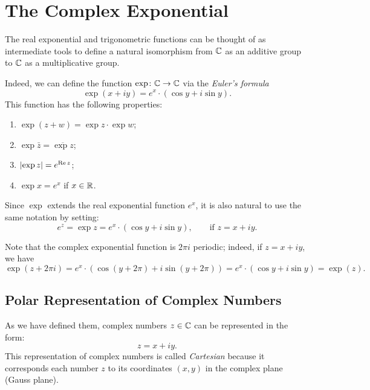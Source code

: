 \section{The Complex Exponential}
\label{sec:esponenziale_complesso}%

The real exponential and trigonometric functions can be thought of as
intermediate tools to define a natural isomorphism from ${\mathbb C}$ as an additive
group to ${\mathbb C}$ as a multiplicative group.

Indeed, we can define the function $\exp \colon {\mathbb C} \to {\mathbb C}$ via the
\emph{Euler's formula}
\[
 \exp(x+iy) = e^x \cdot (\cos y + i \sin y).
\]
This function has the following properties:
\begin{enumerate}
  \item $\exp(z+w) = \exp z \cdot \exp w$;
  \item $\exp\bar z = \overline{\exp z}$;
  \item ${\left|\exp z\right|} = e^{\operatorname{Re} z}$;
  \item $\exp x = e^x$ if $x\in {\mathbb R}$.
\end{enumerate}
Since $\exp$ extends the real exponential function $e^x$, it is also natural to
use the same notation by setting:
%
\[
  e^z = \exp z = e^x\cdot (\cos y + i\sin y), \qquad \text{if $z=x+iy$}.  
\]

Note that the complex exponential function is $2\pi i$ periodic; indeed, if
$z=x+iy$, we have
\[
\exp(z+2\pi i) 
= e^x\cdot (\cos(y+2\pi) + i\sin(y+2\pi)) 
= e^x\cdot (\cos y + i \sin y) 
= \exp(z).
\]

\subsection{Polar Representation of Complex Numbers}

As we have defined them, complex numbers $z\in {\mathbb C}$ can be represented in the
form:
\[
  z = x + i y.
\]
This representation of complex numbers is called \emph{Cartesian} because it
corresponds each number $z$ to its coordinates $(x,y)$ in the complex plane
(Gauss plane).

